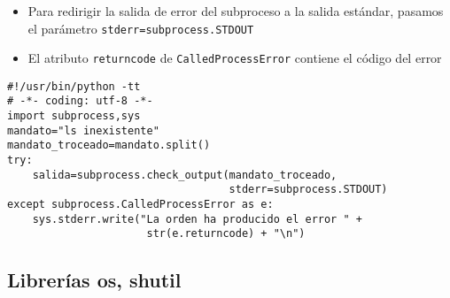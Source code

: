 \documentclass[ucs]{beamer}
\begin{document}
\begin{frame}[fragile]
\frametitle{}
\begin{itemize}
\item
Para redirigir la salida de error del subproceso a la salida estándar, pasamos
el parámetro \verb|stderr=subprocess.STDOUT|
\item
El atributo \verb|returncode| de \verb|CalledProcessError| contiene
el código del error
\end{itemize}

  \begin{footnotesize}
  \begin{verbatim}
#!/usr/bin/python -tt
# -*- coding: utf-8 -*-
import subprocess,sys
mandato="ls inexistente"
mandato_troceado=mandato.split()
try:
    salida=subprocess.check_output(mandato_troceado, 
                                   stderr=subprocess.STDOUT)
except subprocess.CalledProcessError as e:
    sys.stderr.write("La orden ha producido el error " +  
                      str(e.returncode) + "\n")

  \end{verbatim}
  \end{footnotesize}

\end{frame}



\subsection{Librerías os, shutil}
\end{document}
